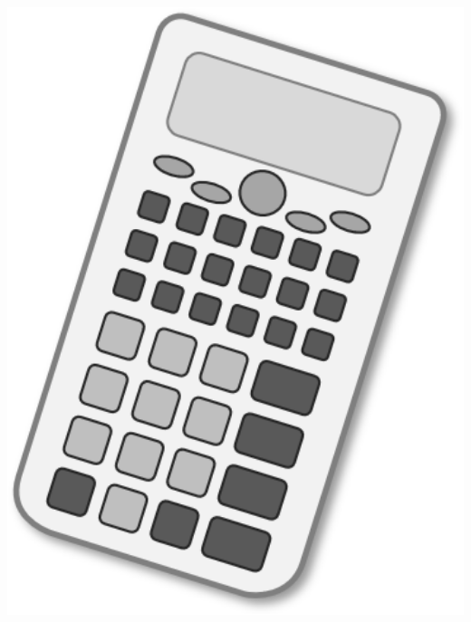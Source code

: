 \documentclass[a4paper,addpoints,12pt]{exam}
\begin{document}
\begin{adjustwidth}{0mm}{-10mm}
\begin{minipage}{\textwidth}
\begin{small}
\end{small}
\end{minipage}%
\begin{minipage}{.1\textwidth}
\vspace*{-50mm}\hspace*{-40mm}\includegraphics[width=1.5\textwidth]{Images/Calculator.png}
\end{minipage}
\end{adjustwidth}

\newpage

\end{document}
